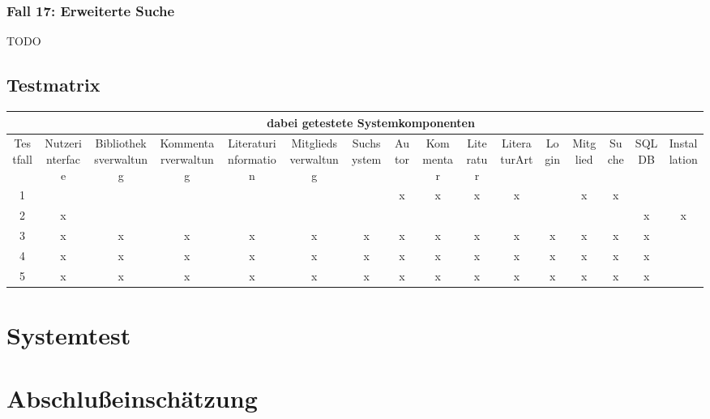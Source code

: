 \subsubsection{Fall 17: Erweiterte Suche}
TODO

\subsection{Testmatrix}
\begin{longtable}{|c|c|c|c|c|c|c|c|c|c|c|c|c|c|c|c|}
\hline
 & \multicolumn{15}{c|}{dabei getestete Systemkomponenten} \\\hline
	Testfall & 
	\multicolumn{1}{R{6em}|}{Nutzerinterface} &
	\multicolumn{1}{R{6em}|}{Bibliotheksverwaltung} &
	\multicolumn{1}{R{6em}|}{Kommentarverwaltung} &
	\multicolumn{1}{R{6em}|}{Literaturinformation} &
	\multicolumn{1}{R{6em}|}{Mitgliedsverwaltung} &
	\multicolumn{1}{R{6em}|}{Suchsystem} &
	\multicolumn{1}{R{6em}|}{Autor} &
	\multicolumn{1}{R{6em}|}{Kommentar} &
	\multicolumn{1}{R{6em}|}{Literatur} &
	\multicolumn{1}{R{6em}|}{LiteraturArt} &
	\multicolumn{1}{R{6em}|}{Login} &
	\multicolumn{1}{R{6em}|}{Mitglied} &
	\multicolumn{1}{R{6em}|}{Suche} &
	\multicolumn{1}{R{6em}|}{SQLDB} &
	\multicolumn{1}{R{6em}|}{Installation}\\
\hline\hline
\endhead
1 &   &   &   &   &   &   & x & x & x & x &   & x & x &   &  \\\hline
2 & x &   &   &   &   &   &   &   &   &   &   &   &   & x & x\\\hline
3 & x & x & x & x & x & x & x & x & x & x & x & x & x & x &  \\\hline
4 & x & x & x & x & x & x & x & x & x & x & x & x & x & x &  \\\hline
5 & x & x & x & x & x & x & x & x & x & x & x & x & x & x &  \\\hline
\end{longtable}

\section{Systemtest}

\section{Abschlußeinschätzung}
